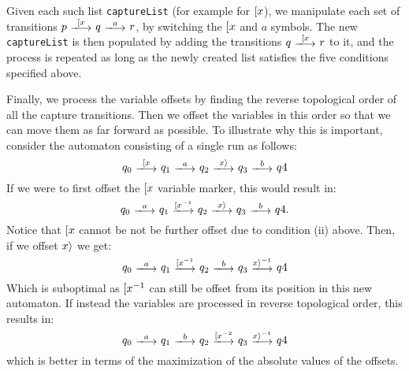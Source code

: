 Given each such list \texttt{captureList} (for example for $[ x$), we
manipulate each set of transitions $p\ \longtrans{\Open{x}}\ q\ \longtrans{a}\
r$, by switching the $[ x$ and $a$ symbols. The new \texttt{captureList} is
then populated by adding the transitions $q\ \longtrans{\Open{x}}\ r$ to it, and
the process is repeated as long as the newly created list satisfies the five
conditions specified above.

Finally, we process the variable offsets by finding the reverse topological
order of all the capture transitions. Then we offset the variables in this order
so that we can move them as far forward as possible. To illustrate why this is
important, consider the automaton consisting of a single run as follows:
$$q_0\ \longtrans{\Open{x}}\ q_1\ \longtrans{a}\ q_2\ \longtrans{\Close{x}}\
q_3\ \longtrans{b}\ q4$$ If we were to first offset the $[ x$ variable
marker, this would result in:
$$q_0\ \longtrans{a}\ q_1\ \longtrans{\Open{x}^{-1}}\ q_2\
\longtrans{\Close{x}}\ q_3\ \longtrans{b}\ q4.$$ Notice that $[ x$ cannot
be not be further offset due to condition (ii) above. Then, if we offset
$x \rangle$ we get: $$q_0\ \longtrans{a}\ q_1\ \longtrans{\Open{x}^{-1}}\ q_2\
\longtrans{b}\ q_3\ \longtrans{\Close{x}^{-1}}\ q4$$ Which is suboptimal as
$[ x^{-1}$ can still be offset from its position in this new automaton. If
instead the variables are processed in reverse topological order, this results
in:
$$q_0\ \longtrans{a}\ q_1\ \longtrans{b}\ q_2\ \longtrans{\Open{x}^{-2}}\ q_3\
\longtrans{\Close{x}^{-1}}\ q4$$ which is better in terms of the maximization of
the absolute values of the offsets.
